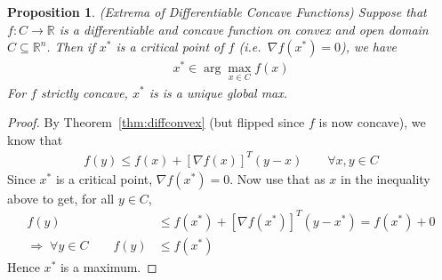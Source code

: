 \documentclass[12pt]{article}
\numberwithin{equation}{section} %
\theoremstyle{plain}
\newtheorem{prop}[thm]{Proposition}
\theoremstyle{definition}
\theoremstyle{remark}
\newcommand{\R}{\mathbb{R}}
\newcommand{\Rn}{\mathbb{R}^n}
\begin{document}
\begin{prop}{\emph{(Extrema of Differentiable Concave Functions)}}
Suppose that $f:C\rightarrow\R$ is a differentiable and concave function
on convex and open domain $C\subseteq\Rn$. Then if $x^*$ is a critical
point of $f$ (i.e.\ $\nabla f(x^*)=0$), we have
\begin{align*}
  x^* \in \arg\max_{x\in C} f(x)
\end{align*}
For $f$ \emph{strictly} concave, $x^*$ is is a \emph{unique} global max.
\end{prop}
\begin{proof}
By Theorem~\ref{thm:diffconvex} (but flipped since $f$ is now concave),
we know that
\begin{align*}
  f(y) \leq f(x) + [\nabla f(x)]^T (y-x)
  \qquad \forall x,y\in C
\end{align*}
Since $x^*$ is a critical point, $\nabla f(x^*)=0$. Now use that as $x$
in the inequality above to get, for all $y\in C$,
\begin{align*}
  f(y) &\leq f(x^*) + [\nabla f(x^*)]^T (y-x^*)
  = f(x^*) + 0\\
  \Rightarrow\; \forall y\in C\qquad
  f(y) &\leq f(x^*)
\end{align*}
Hence $x^*$ is a maximum.
\end{proof}
\end{document}
